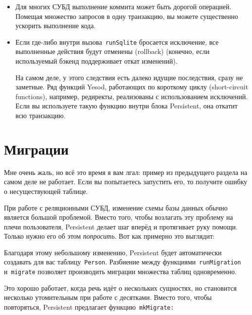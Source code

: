 \begin{itemize}
  \item Для многих СУБД выполнение коммита может быть дорогой операцией.
      Помещая множество запросов в одну транзакцию, вы можете существенно
      ускорить выполнение кода.

  \item Если где-либо внутри вызова~\lstinline'runSqlite' бросается исключение,
      все выполненные действия будут отменены (rollback) (конечно, если
      используемый бэкенд поддерживает откат изменений).

        \begin{remark}
            На самом деле, у этого следствия есть далеко идущие последствия,
            сразу не заметные. Ряд функций Yesod, работающих по короткому циклу
            (short-circuit functions), например, редиректы, реализованы с
            использованием исключений. Если вы используете такую функцию внутри
            блока Persistent, она откатит всю транзакцию.
        \end{remark}
\end{itemize}

\section{Миграции}

Мне очень жаль, но всё это время я вам лгал: пример из предыдущего раздела на
самом деле не работает. Если вы попытаетесь запустить его, то получите ошибку о
несуществующей таблице.

При работе с реляционными СУБД, изменение схемы базы данных обычно является
большой проблемой. Вместо того, чтобы возлагать эту проблему на плечи
пользователя, Persistent делает шаг вперёд и протягивает руку помощи. Только
нужно его об этом \emph{попросить}. Вот как примерно это выглядит:


Благодаря этому небольшому изменению, Persistent будет автоматически создавать
для вас таблицу~\lstinline'Person'. Разбиение между
функциями~\lstinline'runMigration' и~\lstinline'migrate' позволяет производить
миграции множества таблиц одновременно.

Это хорошо работает, когда речь идёт о нескольких сущностях, но становится
несколько утомительным при работе с десятками. Вместо того, чтобы повторяться,
Persistent предлагает функцию~\lstinline'mkMigrate:'


